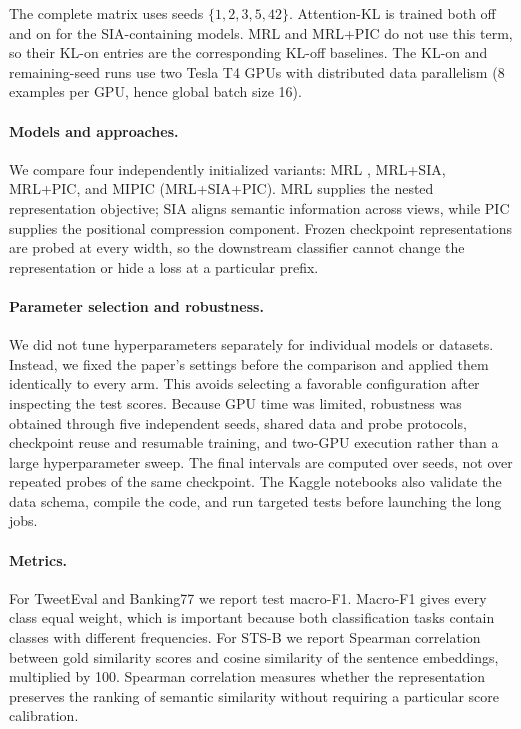 The complete matrix uses seeds $\{1,2,3,5,42\}$.  Attention-KL is trained
both off and on for the SIA-containing models.  MRL and MRL+PIC do not use
this term, so their KL-on entries are the corresponding KL-off baselines.
The KL-on and remaining-seed runs use two Tesla T4 GPUs with distributed data
parallelism (8 examples per GPU, hence global batch size 16).

\paragraph{Models and approaches.}
We compare four independently initialized variants: MRL
\citep{kusupati2022mrl}, MRL+SIA, MRL+PIC, and MIPIC (MRL+SIA+PIC).
MRL supplies the nested representation objective;
SIA aligns semantic information across views, while PIC supplies the
positional compression component.  Frozen checkpoint representations are
probed at every width, so the downstream classifier cannot change the
representation or hide a loss at a particular prefix.

\paragraph{Parameter selection and robustness.}
We did not tune hyperparameters separately for individual models or datasets.
Instead, we fixed the paper's settings before the comparison and applied them
identically to every arm.  This avoids selecting a favorable configuration
after inspecting the test scores.  Because GPU time was limited, robustness
was obtained through five independent seeds, shared data and probe
protocols, checkpoint reuse and resumable training, and two-GPU execution
rather than a large hyperparameter sweep.  The final intervals are computed
over seeds, not over repeated probes of the same checkpoint.  The Kaggle
notebooks also validate the data schema, compile the code, and run targeted
tests before launching the long jobs.

\paragraph{Metrics.}
For TweetEval and Banking77 we report test macro-F1.  Macro-F1 gives every
class equal weight, which is important because both classification tasks
contain classes with different frequencies.  For STS-B we report Spearman
correlation between gold similarity scores and cosine similarity of the
sentence embeddings, multiplied by 100.  Spearman correlation measures
whether the representation preserves the ranking of semantic similarity
without requiring a particular score calibration.

